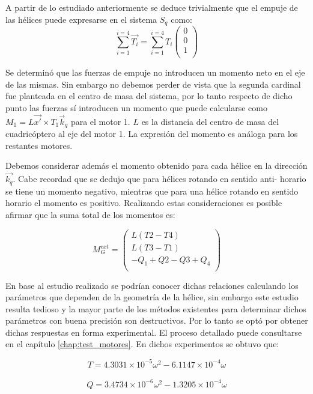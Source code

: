 \documentclass[main]{subfiles}
\begin{document}
A partir de lo estudiado anteriormente se deduce trivialmente que el empuje de las h\'elices puede expresarse en el sistema $S_q$ como:
\begin{equation}
\sum_{i=1}^{i=4} \vec{T_i} =\sum_{i=1}^{i=4}T_i\left(\begin{array}{c}
0\\
0\\
1\\
\end{array} \right)
\end{equation}

Se determin\'o que las fuerzas de empuje no introducen un momento neto en el eje de las mismas. Sin embargo no debemos perder de vista que la segunda cardinal fue planteada en el centro de masa del sistema, por lo tanto respecto de dicho punto las fuerzas s\'i introducen un momento que puede calcularse como $M_1=L\vec{x\prime} \times T_1\vec{k}_q$ para el motor 1. $L$ es la distancia del centro de masa del cuadric\'optero al eje del motor 1. La expresi\'on del momento es an\'aloga para los restantes motores.

Debemos considerar adem\'as el momento obtenido para cada h\'elice en la direcci\'on $\vec{k_q}$. Cabe recordad que se dedujo que para h\'elices rotando en sentido anti- horario se tiene un momento negativo, mientras que para una h\'elice rotando en sentido horario el momento es positivo. Realizando estas consideraciones es posible afirmar que la suma total de los momentos es:

\begin{equation}
M_G^{ext} = \left(\begin{array}{c}
L(T2-T4)\\
L(T3-T1)\\
-Q_1+Q2-Q3+Q_4\\
\end{array} \right)
\end{equation}

En base al estudio realizado se podr\'ian conocer dichas relaciones calculando los par\'ametros que dependen de la geometr\'ia de la h\'elice, sin embargo este estudio resulta tedioso y la mayor parte de los m\'etodos existentes para determinar dichos par\'ametros con buena precisi\'on son destructivos. Por lo tanto se opt\'o por obtener dichas respuestas en forma experimental. El proceso detallado puede consultarse en el cap\'itulo \ref{chap:test_motores}. En dichos experimentos se obtuvo que:

\begin{equation}
T=4.3031\times 10^{-5}\omega^2-6.1147\times 10^{-4}\omega
\end{equation}\\
\begin{equation}
Q= 3.4734\times 10^{-6}\omega^2-1.3205\times 10^{-4}\omega 
\end{equation}
\end{document}

